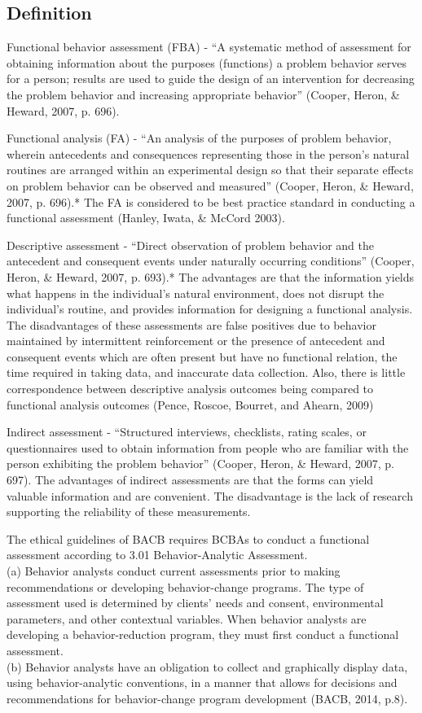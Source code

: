 \subsection{Definition}
Functional behavior assessment (FBA) - ``A systematic method of assessment for obtaining information about the purposes (functions) a problem behavior serves for a person; results are used to guide the design of an intervention for decreasing the problem behavior and increasing appropriate behavior'' (Cooper, Heron, \& Heward, 2007, p. 696).

Functional analysis (FA) - ``An analysis of the purposes of problem behavior, wherein antecedents and consequences representing those in the person's natural routines are arranged within an experimental design so that their separate effects on problem behavior can be observed and measured'' (Cooper, Heron, \& Heward, 2007, p. 696).* The FA is considered to be best practice standard in conducting a functional assessment (Hanley, Iwata, \& McCord 2003).  

Descriptive assessment - ``Direct observation of problem behavior and the antecedent and consequent events under naturally occurring conditions'' (Cooper, Heron, \& Heward, 2007, p. 693).* The advantages are that the information yields what happens in the individual's natural environment, does not disrupt the individual's routine, and provides information for designing a functional analysis. The disadvantages of these assessments are false positives due to behavior maintained by intermittent reinforcement or the presence of antecedent and consequent events which are often present but have no functional relation, the time required in taking data, and inaccurate data collection. Also, there is little correspondence between descriptive analysis outcomes being compared to functional analysis outcomes (Pence, Roscoe, Bourret, and Ahearn, 2009)

Indirect assessment - ``Structured interviews, checklists, rating scales, or questionnaires used to obtain information from people who are familiar with the person exhibiting the problem behavior'' (Cooper, Heron, \& Heward, 2007, p. 697).  The advantages of indirect assessments are that the forms can yield valuable information and are convenient.  The disadvantage is the lack of research supporting the reliability of these measurements.  

The ethical guidelines of BACB requires BCBAs to conduct a functional assessment according to 3.01 Behavior-Analytic Assessment. \\
(a) Behavior analysts conduct current assessments prior to making recommendations or developing behavior-change programs. The type of assessment used is determined by clients' needs and consent, environmental parameters, and other contextual variables. When behavior analysts are developing a behavior-reduction program, they must first conduct a functional assessment.\\
(b) Behavior analysts have an obligation to collect and graphically display data, using behavior-analytic conventions, in a manner that allows for decisions and recommendations for behavior-change program development (BACB, 2014, p.8).

